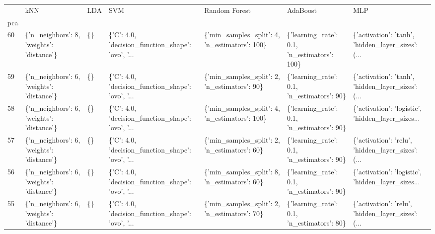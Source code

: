 \begin{tabular}{lllllll}
\toprule
{} &                                        kNN & LDA &                                                SVM &                                  Random Forest &                                     AdaBoost &                                                MLP \\
pca &                                            &     &                                                    &                                                &                                              &                                                    \\
\midrule
60  &  \{'n\_neighbors': 8, 'weights': 'distance'\} &  \{\} &  \{'C': 4.0, 'decision\_function\_shape': 'ovo', '... &  \{'min\_samples\_split': 4, 'n\_estimators': 100\} &  \{'learning\_rate': 0.1, 'n\_estimators': 100\} &  \{'activation': 'tanh', 'hidden\_layer\_sizes': (... \\
59  &  \{'n\_neighbors': 6, 'weights': 'distance'\} &  \{\} &  \{'C': 4.0, 'decision\_function\_shape': 'ovo', '... &   \{'min\_samples\_split': 2, 'n\_estimators': 90\} &   \{'learning\_rate': 0.1, 'n\_estimators': 90\} &  \{'activation': 'tanh', 'hidden\_layer\_sizes': (... \\
58  &  \{'n\_neighbors': 6, 'weights': 'distance'\} &  \{\} &  \{'C': 4.0, 'decision\_function\_shape': 'ovo', '... &  \{'min\_samples\_split': 4, 'n\_estimators': 100\} &   \{'learning\_rate': 0.1, 'n\_estimators': 90\} &  \{'activation': 'logistic', 'hidden\_layer\_sizes... \\
57  &  \{'n\_neighbors': 6, 'weights': 'distance'\} &  \{\} &  \{'C': 4.0, 'decision\_function\_shape': 'ovo', '... &   \{'min\_samples\_split': 2, 'n\_estimators': 60\} &   \{'learning\_rate': 0.1, 'n\_estimators': 90\} &  \{'activation': 'relu', 'hidden\_layer\_sizes': (... \\
56  &  \{'n\_neighbors': 6, 'weights': 'distance'\} &  \{\} &  \{'C': 4.0, 'decision\_function\_shape': 'ovo', '... &   \{'min\_samples\_split': 8, 'n\_estimators': 60\} &   \{'learning\_rate': 0.1, 'n\_estimators': 90\} &  \{'activation': 'logistic', 'hidden\_layer\_sizes... \\
55  &  \{'n\_neighbors': 6, 'weights': 'distance'\} &  \{\} &  \{'C': 4.0, 'decision\_function\_shape': 'ovo', '... &   \{'min\_samples\_split': 2, 'n\_estimators': 70\} &   \{'learning\_rate': 0.1, 'n\_estimators': 80\} &  \{'activation': 'relu', 'hidden\_layer\_sizes': (... \\

\end{tabular}
